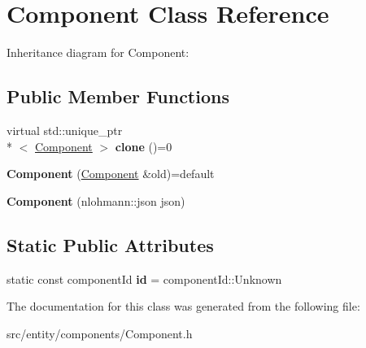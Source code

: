 \hypertarget{classComponent}{\section{Component Class Reference}
\label{classComponent}
}


Inheritance diagram for Component\-:
\subsection*{Public Member Functions}
\begin{DoxyCompactItemize}
\item 
\hypertarget{classComponent_ab2be3d9a939ca73fa91d466be943fe69}{virtual std\-::unique\-\_\-ptr\\*
$<$ \hyperlink{classComponent}{Component} $>$ {\bfseries clone} ()=0}\label{classComponent_ab2be3d9a939ca73fa91d466be943fe69}

\item 
\hypertarget{classComponent_a61a9c995bc0584eb210cf313107204c1}{{\bfseries Component} (\hyperlink{classComponent}{Component} \&old)=default}\label{classComponent_a61a9c995bc0584eb210cf313107204c1}

\item 
\hypertarget{classComponent_a7597fcf89c237b2cf5f584733c7b20d4}{{\bfseries Component} (nlohmann\-::json json)}\label{classComponent_a7597fcf89c237b2cf5f584733c7b20d4}

\end{DoxyCompactItemize}
\subsection*{Static Public Attributes}
\begin{DoxyCompactItemize}
\item 
\hypertarget{classComponent_af71ada3794f6d5a45c2c0823bd6a5cd0}{static const component\-Id {\bfseries id} = component\-Id\-::\-Unknown}\label{classComponent_af71ada3794f6d5a45c2c0823bd6a5cd0}

\end{DoxyCompactItemize}


The documentation for this class was generated from the following file\-:\begin{DoxyCompactItemize}
\item 
src/entity/components/Component.\-h\end{DoxyCompactItemize}
